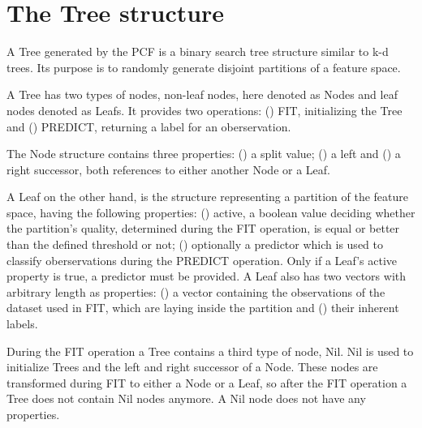 \section{The Tree structure}
\label{sec:tree}

A Tree generated by the PCF is a binary search tree
structure similar to k-d trees. Its purpose is to randomly
generate disjoint partitions of a feature space.

A Tree has two types of nodes, non-leaf nodes, here denoted
as Nodes and leaf nodes denoted as Leafs. It provides two
operations: () FIT, initializing the Tree
and () PREDICT, returning a label for an
oberservation.

The Node structure contains three properties:
() a split value; () a left
and () a right successor, both references to
either another Node or a Leaf.

A Leaf on the other hand, is the structure
representing a partition of the feature space, having the
following properties: () active, a boolean
value deciding whether the partition's quality, determined
during the FIT operation, is equal or better than the
defined threshold or not; () optionally a
predictor which is used to classify oberservations during
the PREDICT operation. Only if a Leaf's active property is
true, a predictor must be provided. A Leaf also has two
vectors with arbitrary length as properties:
() a vector containing the observations of
the dataset used in FIT, which are laying inside the
partition and () their inherent labels.

During the FIT operation a Tree contains a third type of
node, Nil. Nil is used to initialize Trees
and the left and right successor of a Node. These nodes are
transformed during FIT to either a Node or a Leaf, so after
the FIT operation a Tree does not contain Nil nodes
anymore. A Nil node does not have any properties.




